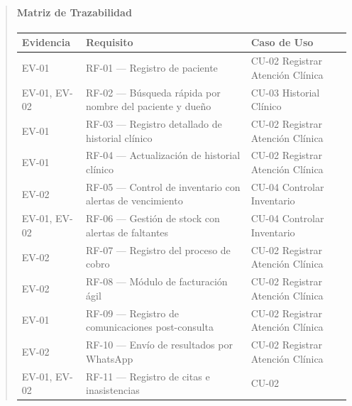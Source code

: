 \documentclass[
]{article}
\newcounter{none} %
\begin{document}
\begin{quote}
\paragraph{Matriz de Trazabilidad}\label{matriz-de-trazabilidad-1}

{\def\LTcaptype{none} %
\begin{longtable}[]{|
  >{\raggedright\arraybackslash}p{}|
  >{\raggedright\arraybackslash}p{}|
  >{\raggedright\arraybackslash}p{}|}
\hline
\begin{minipage}[b]{\linewidth}\raggedright
\textbf{Evidencia}
\end{minipage} & \begin{minipage}[b]{\linewidth}\centering
\textbf{Requisito}
\end{minipage} & \begin{minipage}[b]{\linewidth}\raggedright
\textbf{Caso de Uso}
\end{minipage} \\
\hline
\endhead
\hline
\endlastfoot
EV-01 & RF-01 --- Registro de paciente & CU-02 Registrar Atención
Clínica \\
\hline
EV-01, EV-02 & RF-02 --- Búsqueda rápida por nombre del paciente y dueño
& CU-03 Historial Clínico \\
\hline
EV-01 & RF-03 --- Registro detallado de historial clínico & CU-02
Registrar Atención Clínica \\
\hline
EV-01 & RF-04 --- Actualización de historial clínico & CU-02 Registrar
Atención Clínica \\
\hline
EV-02 & RF-05 --- Control de inventario con alertas de vencimiento &
CU-04 Controlar Inventario \\
\hline
EV-01, EV-02 & RF-06 --- Gestión de stock con alertas de faltantes &
CU-04 Controlar Inventario \\
\hline
EV-02 & RF-07 --- Registro del proceso de cobro & CU-02 Registrar
Atención Clínica \\
\hline
EV-02 & RF-08 --- Módulo de facturación ágil & CU-02 Registrar Atención
Clínica \\
\hline
EV-01 & RF-09 --- Registro de comunicaciones post-consulta & CU-02
Registrar Atención Clínica \\
\hline
EV-02 & RF-10 --- Envío de resultados por WhatsApp & CU-02 Registrar
Atención Clínica \\
\hline
EV-01, EV-02 & RF-11 --- Registro de citas e inasistencias & CU-02

\end{longtable}}
\end{quote}
\end{document}
